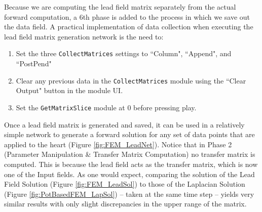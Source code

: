 Because we are computing the lead field matrix separately from the actual forward computation, a 6th phase is added to the process in which we save out the data field.
A practical implementation of data collection when executing the lead field matrix generation network is the need to:
\begin{enumerate}
\itemsep-.25em
\item Set the three {\tt CollectMatrices} settings to ``Column", ``Append", and ``PostPend"
\item Clear any previous data in the {\tt CollectMatrices} module using the ``Clear Output" button in the module UI.
\item Set the {\tt GetMatrixSlice} module at 0 before pressing play.
\end{enumerate}

Once a lead field matrix is generated and saved, it can be used in a relatively simple network to generate a forward solution for any set of data points that are applied to the heart (Figure \ref{fig:FEM_LeadNet}).
Notice that in Phase 2 (Parameter Manipulation \& Transfer Matrix Computation) no transfer matrix is computed.
This is because the lead field acts as the transfer matrix, which is now one of the Input fields.
As one would expect, comparing the solution of the Lead Field Solution (Figure \ref{fig:FEM_LeadSol}) to those of the Laplacian Solution (Figure \ref{fig:PotBasedFEM_LapSol}) -- taken at the same time step -- yields very similar results with only slight discrepancies in the upper range of the matrix.



\newpage

